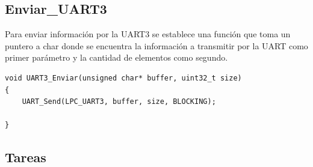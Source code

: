 \documentclass[a4paper,12pt]{article}
\begin{document}
\subsection{Enviar\_UART3}
Para enviar información por la UART3 se establece una función que toma un puntero a char donde se encuentra la información a transmitir por la UART como primer parámetro y la cantidad de elementos como segundo.
\begin{verbatim}
void UART3_Enviar(unsigned char* buffer, uint32_t size)
{
	UART_Send(LPC_UART3, buffer, size, BLOCKING);

}
\end{verbatim} 

\subsection{Tareas}
\end{document}
